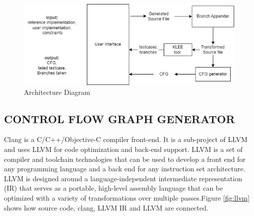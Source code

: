 \begin{figure}[h]
\centering
\includegraphics[width=1\textwidth]{3/systemarchi.png}
\caption{Architecture Diagram }
\label{fig:arch}
\end{figure}


\subsection{CONTROL FLOW GRAPH GENERATOR}

Clang is a C/C++/Objective-C compiler front-end. It is a sub-project of LLVM and uses LLVM for code optimization and back-end support. LLVM is a set of compiler and toolchain technologies that can be used to develop a front end for any programming language and a back end for any instruction set architecture. LLVM is designed around a language-independent intermediate representation (IR) that serves as a portable, high-level assembly language that can be optimized with a variety of transformations over multiple passes.Figure \ref{fig:llvm} shows how source code, clang, LLVM IR and LLVM are connected.

